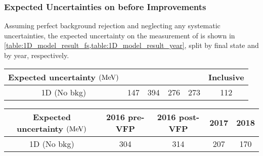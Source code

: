 \subsubsection{Expected Uncertainties on \mH before Improvements}
Assuming perfect background rejection and neglecting any systematic uncertainties, the expected uncertainty on the measurement of \mH is shown in \cref{table:1D_model_result_fs,table:1D_model_result_year}, split by final state and by year, respectively.
\begin{table}[!ht]
    \centering
	\begin{tabular}{cccccc}
            \hline      
        Expected uncertainty $(\text{Me\hspace{-.08em}V})$	&	\fourmu	&	\foure	&	\twoetwomu	& \twomutwoe	& Inclusive	\\
            \hline
        1D	(No bkg) &	147	&	394	&	276	&	273	&	112	\\
            \hline
        \end{tabular}
    \label{table:1D_model_result_fs}
\end{table}
\begin{table}[!ht]
    \centering
	\begin{tabular}{|ccccc|}
            \hline      
        Expected uncertainty $(\text{Me\hspace{-.08em}V})$	&	2016 pre-VFP	&	2016 post-VFP	&	2017	&	2018	\\
            \hline
        1D (No bkg)	&	304	&	314	&	207	&	170	\\
            \hline
        \end{tabular}
    \label{table:1D_model_result_year}
\end{table}